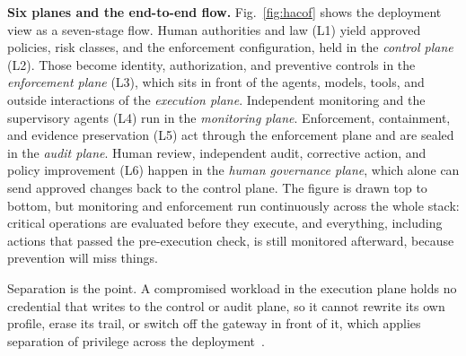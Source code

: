\documentclass{ieeeaccess}
\begin{document}
\textbf{Six planes and the end-to-end flow.} Fig.~\ref{fig:hacof} shows the deployment view as a seven-stage flow. Human authorities and law (L1) yield approved policies, risk classes, and the enforcement configuration, held in the \textit{control plane} (L2). Those become identity, authorization, and preventive controls in the \textit{enforcement plane} (L3), which sits in front of the agents, models, tools, and outside interactions of the \textit{execution plane}. Independent monitoring and the supervisory agents (L4) run in the \textit{monitoring plane}. Enforcement, containment, and evidence preservation (L5) act through the enforcement plane and are sealed in the \textit{audit plane}. Human review, independent audit, corrective action, and policy improvement (L6) happen in the \textit{human governance plane}, which alone can send approved changes back to the control plane. The figure is drawn top to bottom, but monitoring and enforcement run continuously across the whole stack: critical operations are evaluated before they execute, and everything, including actions that passed the pre-execution check, is still monitored afterward, because prevention will miss things.

Separation is the point. A compromised workload in the execution plane holds no credential that writes to the control or audit plane, so it cannot rewrite its own profile, erase its trail, or switch off the gateway in front of it, which applies separation of privilege across the deployment~\cite{saltzer1975protection}.
\end{document}
